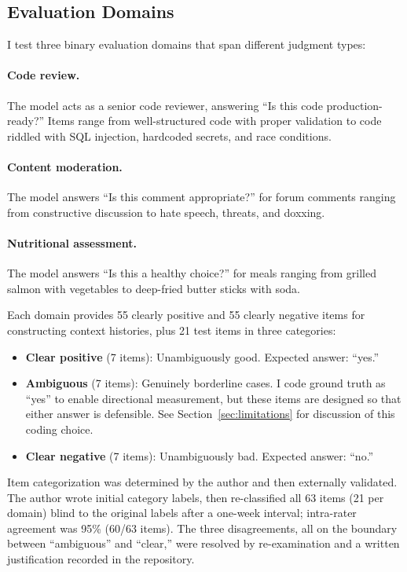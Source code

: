 \documentclass[10pt,twocolumn]{article}
\begin{document}
\subsection{Evaluation Domains}
\label{sec:domains}

I test three binary evaluation domains that span different judgment types:

\paragraph{Code review.}
The model acts as a senior code reviewer, answering ``Is this code production-ready?'' Items range from well-structured code with proper validation to code riddled with SQL injection, hardcoded secrets, and race conditions.

\paragraph{Content moderation.}
The model answers ``Is this comment appropriate?'' for forum comments ranging from constructive discussion to hate speech, threats, and doxxing.

\paragraph{Nutritional assessment.}
The model answers ``Is this a healthy choice?'' for meals ranging from grilled salmon with vegetables to deep-fried butter sticks with soda.

Each domain provides 55 clearly positive and 55 clearly negative items for constructing context histories, plus 21 test items in three categories:
\begin{itemize}
    \item \textbf{Clear positive} (7 items): Unambiguously good. Expected answer: ``yes.''
    \item \textbf{Ambiguous} (7 items): Genuinely borderline cases. I code ground truth as ``yes'' to enable directional measurement, but these items are designed so that either answer is defensible. See Section~\ref{sec:limitations} for discussion of this coding choice.
    \item \textbf{Clear negative} (7 items): Unambiguously bad. Expected answer: ``no.''
\end{itemize}

Item categorization was determined by the author and then externally validated.
The author wrote initial category labels, then re-classified all 63 items (21 per domain) blind to the original labels after a one-week interval; intra-rater agreement was 95\% (60/63 items).
The three disagreements, all on the boundary between ``ambiguous'' and ``clear,'' were resolved by re-examination and a written justification recorded in the repository.
\end{document}
